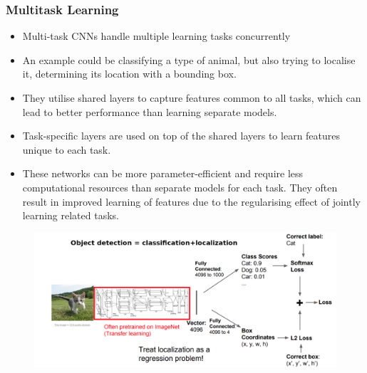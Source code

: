 \subsubsection{Multitask Learning}
\begin{itemize}
\item Multi-task CNNs handle multiple learning tasks concurrently
\item An example could be classifying a type of animal, but also trying to localise it, determining its location with a bounding box.
\item They utilise shared layers to capture features common to all tasks, which can lead to better performance than learning separate models.
\item Task-specific layers are used on top of the shared layers to learn features unique to each task.
\item These networks can be more parameter-efficient and require less computational resources than separate models for each task. They often result in improved learning of features due to the regularising effect of jointly learning related tasks.
\end{itemize}

\begin{figure}
    \centering
    \includegraphics[width=0.75\linewidth]{img/multitask.png}
    
    
\end{figure}
